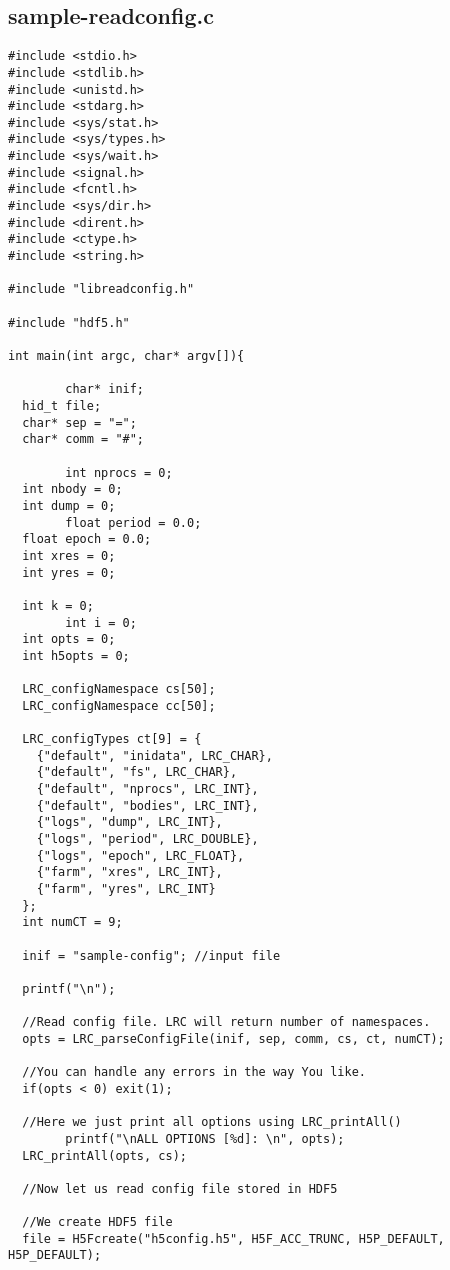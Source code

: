 \hypertarget{sample-readconfig_8c-example}{
\subsection{sample-readconfig.c}
}


\begin{DocInclude}\begin{verbatim}
#include <stdio.h>
#include <stdlib.h>
#include <unistd.h>
#include <stdarg.h>
#include <sys/stat.h>
#include <sys/types.h>
#include <sys/wait.h>
#include <signal.h>
#include <fcntl.h>
#include <sys/dir.h>
#include <dirent.h>
#include <ctype.h>
#include <string.h>

#include "libreadconfig.h"

#include "hdf5.h"

int main(int argc, char* argv[]){

        char* inif; 
  hid_t file;
  char* sep = "=";
  char* comm = "#";

        int nprocs = 0;
  int nbody = 0;
  int dump = 0;
        float period = 0.0;
  float epoch = 0.0;
  int xres = 0;
  int yres = 0;
        
  int k = 0;
        int i = 0;
  int opts = 0;
  int h5opts = 0;

  LRC_configNamespace cs[50];
  LRC_configNamespace cc[50];

  LRC_configTypes ct[9] = {
    {"default", "inidata", LRC_CHAR},
    {"default", "fs", LRC_CHAR},
    {"default", "nprocs", LRC_INT},
    {"default", "bodies", LRC_INT},
    {"logs", "dump", LRC_INT},
    {"logs", "period", LRC_DOUBLE},
    {"logs", "epoch", LRC_FLOAT},
    {"farm", "xres", LRC_INT},
    {"farm", "yres", LRC_INT}
  };
  int numCT = 9;
        
  inif = "sample-config"; //input file
        
  printf("\n");
  
  //Read config file. LRC will return number of namespaces.
  opts = LRC_parseConfigFile(inif, sep, comm, cs, ct, numCT);
  
  //You can handle any errors in the way You like.
  if(opts < 0) exit(1);

  //Here we just print all options using LRC_printAll()
        printf("\nALL OPTIONS [%d]: \n", opts);
  LRC_printAll(opts, cs);

  //Now let us read config file stored in HDF5

  //We create HDF5 file
  file = H5Fcreate("h5config.h5", H5F_ACC_TRUNC, H5P_DEFAULT, H5P_DEFAULT);
  

\end{verbatim}
\end{DocInclude}
